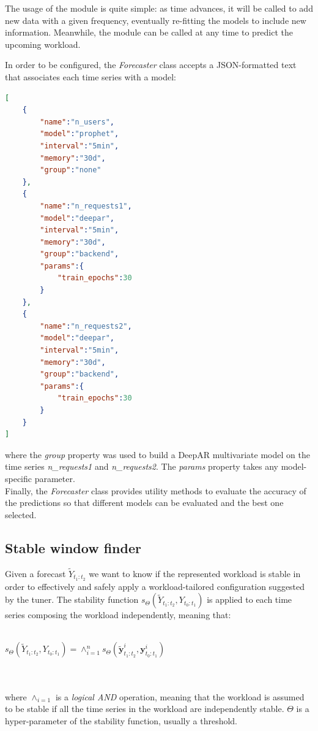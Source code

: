 \documentclass[a4paper]{article} %
\begin{document}
	The usage of the module is quite simple: as time advances, it will be called to add new data with a given frequency, eventually re-fitting the models to include new information. Meanwhile, the module can be called at any time to predict the upcoming workload. 
	
	In order to be configured, the \textit{Forecaster} class accepts a JSON-formatted text that associates each time series with a model:\\
\begin{lstlisting}[language=json,firstnumber=1, frame=single]
[
	{
		"name":"n_users",
		"model":"prophet",
		"interval":"5min",
		"memory":"30d",
		"group":"none"
	},
	{
		"name":"n_requests1",
		"model":"deepar",
		"interval":"5min",
		"memory":"30d",
		"group":"backend",
		"params":{
			"train_epochs":30
		}
	},
	{
		"name":"n_requests2",
		"model":"deepar",
		"interval":"5min",
		"memory":"30d",
		"group":"backend",
		"params":{
			"train_epochs":30
		}
	}
]
\end{lstlisting}
	where the \textit{group} property was used to build a DeepAR multivariate model on the time series \textit{n\_requests1} and \textit{n\_requests2}. The \textit{params} property takes any model-specific parameter.\\
	Finally, the \textit{Forecaster} class provides utility methods to evaluate the accuracy of the predictions so that different models can be evaluated and the best one selected.
	
	\subsection{Stable window finder} \label{ssec:stable_window_finder}
	Given a forecast $\tilde{Y}_{t_1:t_2}$ we want to know if the represented workload is stable in order to effectively and safely apply a workload-tailored configuration suggested by the tuner.
	The stability function $s_\Theta(\tilde{Y}_{t_1:t_2}, Y_{t_0:t_1})$ is applied to each time series composing the workload independently, meaning that:\\\\
	\centerline{
	$
	s_\Theta(\tilde{Y}_{t_1:t_2}, Y_{t_0:t_1}) = \wedge_{i=1} ^n s_\Theta(\tilde{\pmb{y}}_{t_1:t_2}^i, \pmb{y}_{t_0:t_1}^i)
	$
	}\\\\ 
	where $ \wedge_{i=1}$ is a \textit{logical AND} operation, meaning that the workload is assumed to be stable if all the time series in the workload are independently stable. $\Theta$ is a hyper-parameter of the stability function, usually a threshold.
	
\end{document}

